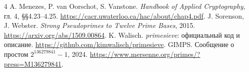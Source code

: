 \documentclass[11pt,a4paper]{article}
\begin{document}
\begingroup\small
\begin{thebibliography}{4}
\setlength{\itemsep}{3pt}
\setlength{\parskip}{1pt}
 A. Menezes, P. van Oorschot, S. Vanstone.
\emph{Handbook of Applied Cryptography}, гл. 4, §§4.23--4.25.
\url{https://cacr.uwaterloo.ca/hac/about/chap4.pdf}.
 J. Sorenson, J. Webster.
\emph{Strong Pseudoprimes to Twelve Prime Bases}, 2015.
\url{https://arxiv.org/abs/1509.00864}.
 K. Walisch. \emph{primesieve}: официальный код и описание.
\url{https://github.com/kimwalisch/primesieve}.
 GIMPS. Сообщение о простом $2^{136279841}-1$, 2024.
\url{https://www.mersenne.org/primes/?press=M136279841}.
\end{thebibliography}
\endgroup
\end{document}
